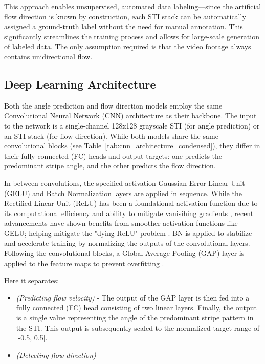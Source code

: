 \documentclass[12pt]{elsarticle}
\begin{document}
This approach enables unsupervised, automated data labeling—since the artificial flow direction is known by construction, each STI stack can be automatically assigned a ground-truth label without the need for manual annotation. This significantly streamlines the training process and allows for large-scale generation of labeled data. The only assumption required is that the video footage always contains unidirectional flow.
\subsection{Deep Learning Architecture}
Both the angle prediction and flow direction models employ the same Convolutional Neural Network (CNN) architecture as their backbone. The input to the network is a single-channel 128x128 grayscale STI (for angle prediction) or an STI stack (for flow direction). While both models share the same convolutional blocks (see Table~\ref{tab:cnn_architecture_condensed}), they differ in their fully connected (FC) heads and output targets: one predicts the predominant stripe angle, and the other predicts the flow direction.

In between convolutions, the specified activation Gaussian Error Linear Unit (GELU) and Batch Normalization layers are applied in sequence. While the Rectified Linear Unit (ReLU) has been a foundational activation function due to its computational efficiency and ability to mitigate vanisihing gradients \cite{pmlr-v15-glorot11a}, recent advancements have shown benefits from smoother activation functions like GELU; helping mitigate the "dying ReLU" problem \cite{hendrycks2016GELU, lu2019dying}. BN is applied to stabilize and accelerate training \cite{ioffe2015batch} by normalizing the outputs of the convolutional layers. Following the convolutional blocks, a Global Average Pooling (GAP) layer is applied to the feature maps to prevent overfitting \cite{lin2013GAP, watanabe2021improving}. 

Here it separates:
\begin{itemize}
    \item \textit{(Predicting flow velocity)} - The output of the GAP layer is then fed into a fully connected (FC) head consisting of two linear layers. Finally, the output is a single value representing the angle of the predominant stripe pattern in the STI. This output is subsequently scaled to the normalized target range of [-0.5, 0.5].
    \item \textit{(Detecting flow direction)}
\end{itemize}
\end{document}
